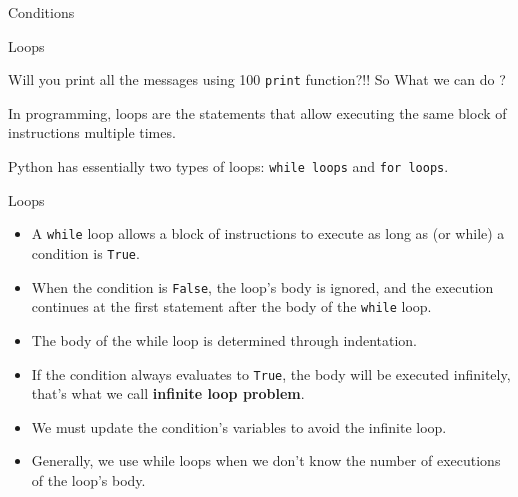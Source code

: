 \begin{frame}[fragile]{Conditions}
\end{frame}
\begin{frame}[fragile]{Loops}

    \pause
    Will you print all the messages using 100 \texttt{print} function?!! So What we can do ?
    \pause    
    \begin{block}{}
        In programming, loops are the statements that allow executing the same block of instructions multiple times.


        Python has essentially two types of loops: \texttt{while loops} and \texttt{for loops}.
    \end{block}
\end{frame}
\begin{frame}[fragile]{Loops}
 \begin{itemize}[<+->]
    \item A \texttt{while} loop allows a block of instructions to execute as long as (or while) a condition is \texttt{True}.
    \item When the condition is \texttt{False}, the loop's body is ignored, and the execution continues at the first statement after the body of the \texttt{while} loop.
    \item The body of the while loop is determined through indentation.
    \item If the condition always evaluates to \texttt{True}, the body will be executed infinitely, that's what we call {\bf infinite loop problem}.
    \item We must update the condition's variables to avoid the infinite loop.
    \item Generally, we use while loops when we don't know the number of executions of the loop's body.
\end{itemize}
\end{frame}
